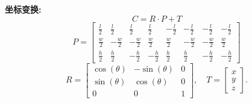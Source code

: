 \begin{tcolorbox}
	\textbf{坐标变换:}
	\begin{equation}
		C = R \cdot P + T
	\end{equation}
	\begin{equation}
		P=
		\begin{bmatrix}
			\frac{l}{2} & \frac{l}{2} & \frac{l}{2} & \frac{l}{2} & -\frac{l}{2} & -\frac{l}{2} &
			-\frac{l}{2} & -\frac{l}{2} \\
			\frac{w}{2} & -\frac{w}{2} & -\frac{w}{2} & \frac{w}{2} & \frac{w}{2} & -\frac{w}{2} & -\frac{w}{2} & \frac{w}{2} \\
			\frac{h}{2} & \frac{h}{2} & -\frac{h}{2} & -\frac{h}{2} & \frac{h}{2} & \frac{h}{2} & -\frac{h}{2} & -\frac{h}{2}
		\end{bmatrix}
	\end{equation}
	\begin{equation}R=
		\begin{bmatrix}
			\cos(\theta) & -\sin(\theta) & 0 \\
			\sin(\theta) & \cos(\theta) & 0 \\
			0 & 0 & 1
		\end{bmatrix},\quad T=
		\begin{bmatrix}
			x \\
			y \\
			z
		\end{bmatrix}.
	\end{equation}
	
\end{tcolorbox}

